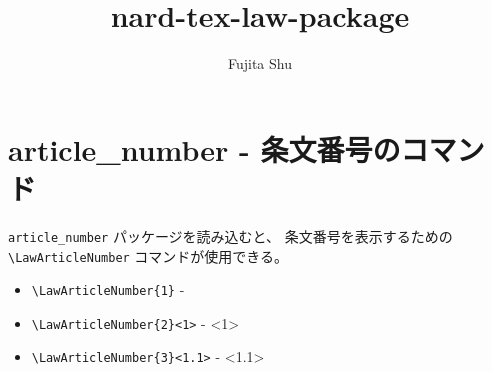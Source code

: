 \documentclass[oneside,10pt,a4paper]{jsarticle}
\title{nard-tex-law-package}
\author{Fujita Shu}
\begin{document}
  \maketitle

  \section{article\_number - 条文番号のコマンド}

  \verb|article_number| パッケージを読み込むと、
  条文番号を表示するための\\
  \verb|\LawArticleNumber| コマンドが使用できる。

  \begin{itemize}
    \item \verb|\LawArticleNumber{1}| - 
    \item \verb|\LawArticleNumber{2}<1>| - <1>
    \item \verb|\LawArticleNumber{3}<1.1>| - <1.1>
  \end{itemize}
\end{document}
